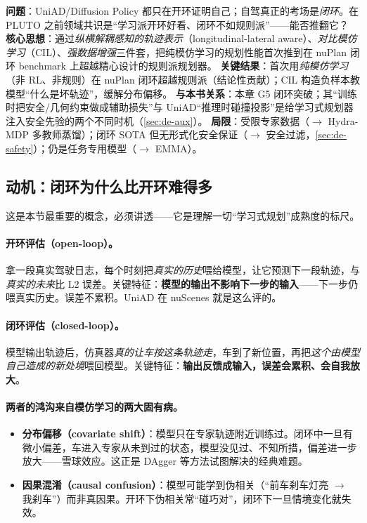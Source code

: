 \begin{paper}\label{paper:de-pluto}
\textbf{问题}：UniAD/Diffusion Policy 都只在开环证明自己；自驾真正的考场是\emph{闭环}。在 PLUTO 之前领域共识是“学习派开环好看、闭环不如规则派”——能否推翻它？
\textbf{核心思想}\cite{cheng2024pluto}：通过\emph{纵横解耦感知的轨迹表示}（longitudinal-lateral aware）、\emph{对比模仿学习}（CIL）、\emph{强数据增强}三件套，把纯模仿学习的规划性能首次推到在 nuPlan 闭环 benchmark 上超越精心设计的规则派规划器。
\textbf{关键结果}：首次用\emph{纯模仿学习}（非 RL、非规则）在 nuPlan 闭环超越规则派（结论性贡献）；CIL 构造负样本教模型“什么是坏轨迹”，缓解分布偏移。
\textbf{与本书关系}：本章 G5 闭环突破；其“训练时把安全/几何约束做成辅助损失”与 UniAD“推理时碰撞投影”是给学习式规划器注入安全先验的两个不同时机（\cref{sec:de-aux}）。
\textbf{局限}：受限专家数据（$\to$ Hydra-MDP 多教师蒸馏）；闭环 SOTA 但无形式化安全保证（$\to$ 安全过滤，\cref{sec:de-safety}）；仍是任务专用模型（$\to$ EMMA）。
\end{paper}

\subsection{动机：闭环为什么比开环难得多}
\label{sec:de-closedloop}

这是本节最重要的概念，必须讲透——它是理解一切“学习式规划”成熟度的标尺。

\paragraph{开环评估（open-loop）。}
拿一段真实驾驶日志，每个时刻把\emph{真实的历史}喂给模型，让它预测下一段轨迹，与\emph{真实的未来}比 L2 误差。关键特征：\textbf{模型的输出不影响下一步的输入}——下一步仍喂真实历史。误差不累积。UniAD 在 nuScenes 就是这么评的。

\paragraph{闭环评估（closed-loop）。}
模型输出轨迹后，仿真器\emph{真的让车按这条轨迹走}，车到了新位置，再把\emph{这个由模型自己造成的新处境}喂回模型。关键特征：\textbf{输出反馈成输入，误差会累积、会自我放大}。

\paragraph{两者的鸿沟来自模仿学习的两大固有病。}
\begin{itemize}
  \item \textbf{分布偏移（covariate shift）}：模型只在专家轨迹附近训练过。闭环中一旦有微小偏差，车进入专家从未到过的状态，模型没见过、不知所措，偏差进一步放大——雪球效应。这正是 DAgger\cite{ross2011dagger} 等方法试图解决的经典难题。
  \item \textbf{因果混淆（causal confusion）}：模型可能学到伪相关（“前车刹车灯亮 $\to$ 我刹车”）而非真因果。开环下伪相关常“碰巧对”，闭环下一旦情境变化就失效。
\end{itemize}

